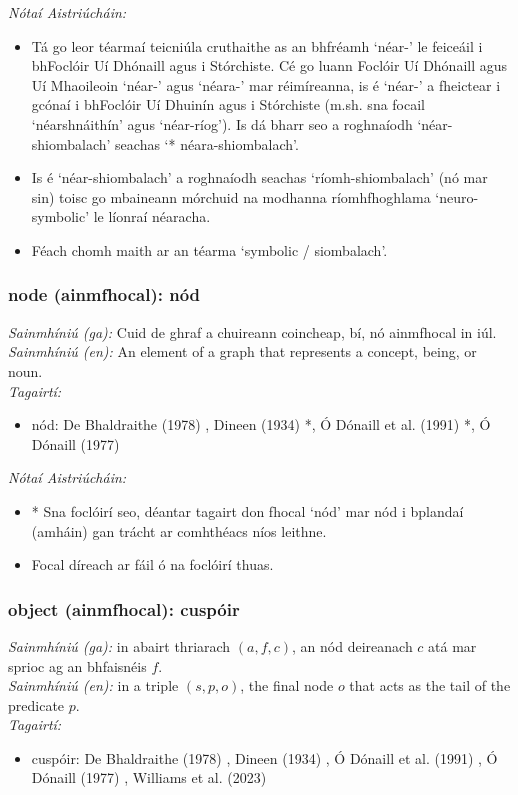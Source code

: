  \noindent \textit{Nótaí Aistriúcháin:}
\begin{itemize}
	\item Tá go leor téarmaí teicniúla cruthaithe as an bhfréamh `néar-' le feiceáil i bhFoclóir Uí Dhónaill agus i Stórchiste. Cé go luann Foclóir Uí Dhónaill agus Uí Mhaoileoin `néar-' agus `néara-' mar réimíreanna, is é `néar-' a fheictear i gcónaí i bhFoclóir Uí Dhuinín agus i Stórchiste (m.sh. sna focail `néarshnáithín' agus `néar-ríog'). Is dá bharr seo a roghnaíodh `néar-shiombalach' seachas `* néara-shiombalach'.
	\item Is é `néar-shiombalach' a roghnaíodh seachas `ríomh-shiombalach' (nó mar sin) toisc go mbaineann mórchuid na modhanna ríomhfhoghlama `neuro-symbolic' le líonraí néaracha.
	\item Féach chomh maith ar an téarma `symbolic / siombalach'.
\end{itemize}


\subsubsection*{node (ainmfhocal): nód}
 \noindent \textit{Sainmhíniú (ga):} Cuid de ghraf a chuireann coincheap, bí, nó ainmfhocal in iúl.
\\
 \noindent \textit{Sainmhíniú (en):} An element of a graph that represents a concept, being, or noun.
\\
 \noindent \textit{Tagairtí:}
\begin{itemize}
	\item nód: De Bhaldraithe (1978) \cite{de-bhaldraithe}, Dineen (1934) \cite{dineen}*, Ó Dónaill et al. (1991) \cite{focloir-beag}*, Ó Dónaill (1977) \cite{odonaill}
\end{itemize}

 \noindent \textit{Nótaí Aistriúcháin:}
\begin{itemize}
	\item * Sna foclóirí seo, déantar tagairt don fhocal `nód' mar nód i bplandaí (amháin) gan trácht ar comhthéacs níos leithne.
	\item Focal díreach ar fáil ó na foclóirí thuas.
\end{itemize}


\subsubsection*{object (ainmfhocal): cuspóir}
 \noindent \textit{Sainmhíniú (ga):} in abairt thriarach $(a,f,c)$, an nód deireanach $c$ atá mar sprioc ag an bhfaisnéis $f$.
\\
 \noindent \textit{Sainmhíniú (en):} in a triple $(s,p,o)$, the final node $o$ that acts as the tail of the predicate $p$.
\\
 \noindent \textit{Tagairtí:}
\begin{itemize}
	\item cuspóir: De Bhaldraithe (1978) \cite{de-bhaldraithe}, Dineen (1934) \cite{dineen}, Ó Dónaill et al. (1991) \cite{focloir-beag}, Ó Dónaill (1977) \cite{odonaill}, Williams et al. (2023) \cite{storchiste}
\end{itemize}

